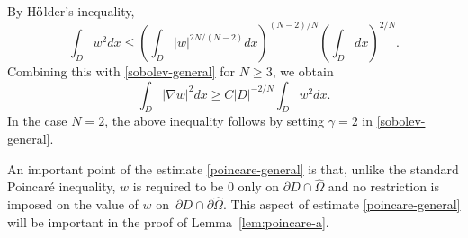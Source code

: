 \documentclass[a4paper,12pt,fullpage]{article}
\numberwithin{equation}{section}
\begin{document}
By H${\rm \ddot{o}}$lder's inequality, 
\[
\int_{D} w^2 dx \leq \left(\int_{D} |w|^{2N/(N-2)} dx\right)^{(N-2)/N}\left(\int_D dx\right)^{2/N}.
\]
Combining this with \eqref{sobolev-general} for $N\geq 3$, we obtain
\begin{equation}\label{poincare-general}
\int_{D}|\nabla w|^2 dx \geq C |D|^{-2/N}\int_{D} w^2 dx.
\end{equation}
In the case $N=2$, the above inequality follows by setting $\gamma=2$ in \eqref{sobolev-general}.

An important point of the estimate \eqref{poincare-general} is that, unlike the standard Poincar\'e inequality, $w$ is required to be $0$ only on $\partial D\cap\widehat\Omega$ and no restriction is imposed on the value of $w$ on~$\partial D\cap\partial\widehat\Omega$. This aspect of estimate \eqref{poincare-general} will be important in the proof of Lemma~\ref{lem:poincare-a}.
\end{document}
